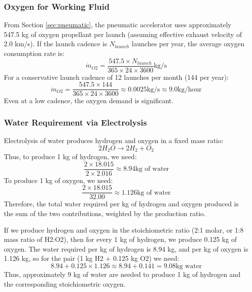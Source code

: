 \subsubsection{Oxygen for Working Fluid}
From Section \ref{sec:pneumatic}, the pneumatic accelerator uses approximately 547.5 kg of oxygen propellant per launch (assuming effective exhaust velocity of 2.0 km/s). If the launch cadence is $N_{launch}$ launches per year, the average oxygen consumption rate is:
\begin{equation}
\dot{m}_{O2} = \frac{547.5 \times N_{launch}}{365 \times 24 \times 3600}  \text{kg/s}
\end{equation}
For a conservative launch cadence of 12 launches per month (144 per year):
\begin{equation}
\dot{m}_{O2} = \frac{547.5 \times 144}{365 \times 24 \times 3600} \approx 0.0025  \text{kg/s} \approx 9.0  \text{kg/hour}
\end{equation}
Even at a low cadence, the oxygen demand is significant.

\subsubsection{Water Requirement via Electrolysis}
Electrolysis of water produces hydrogen and oxygen in a fixed mass ratio:
\begin{equation}
2H_2O \rightarrow 2H_2 + O_2
\end{equation}
Thus, to produce 1 kg of hydrogen, we need:
\begin{equation}
\frac{2 \times 18.015}{2 \times 2.016} \approx 8.94  \text{kg of water}
\end{equation}
To produce 1 kg of oxygen, we need:
\begin{equation}
\frac{2 \times 18.015}{32.00} \approx 1.126  \text{kg of water}
\end{equation}
Therefore, the total water required per kg of hydrogen and oxygen produced is the sum of the two contributions, weighted by the production ratio.

If we produce hydrogen and oxygen in the stoichiometric ratio (2:1 molar, or 1:8 mass ratio of H2:O2), then for every 1 kg of hydrogen, we produce 0.125 kg of oxygen. The water required per kg of hydrogen is 8.94 kg, and per kg of oxygen is 1.126 kg, so for the pair (1 kg H2 + 0.125 kg O2) we need:
\begin{equation}
8.94 + 0.125 \times 1.126 \approx 8.94 + 0.141 = 9.08  \text{kg water}
\end{equation}
Thus, approximately 9 kg of water are needed to produce 1 kg of hydrogen and the corresponding stoichiometric oxygen.

